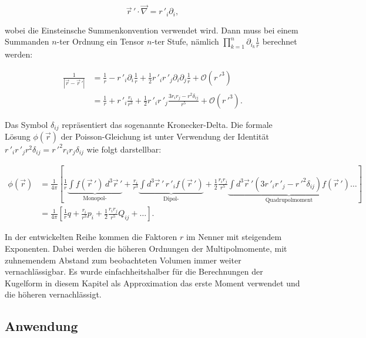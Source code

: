 \begin{equation*}
\vec{r}\,' \cdot \vec{\nabla} = r\,'_{i} \partial_{i},
\end{equation*}

\noindent
wobei die Einsteinsche Summenkonvention verwendet wird.
Dann muss bei einem Summanden \(n\)-ter Ordnung ein Tensor \(n\)-ter Stufe, nämlich \(\textstyle \prod_{k=1}^{n} \partial_{i_{k}} \frac{1}{r}\) berechnet werden:


\begin{align*}
\frac{1}{\left| \vec{r} - \vec{r}\,' \right|} &= \frac{1}{r} - r\,'_{i} \partial_{i} \frac{1}{r} + \frac{1}{2} r\,'_{i} r\,'_{j} \partial_{i} \partial_{j} \frac{1}{r} + \mathcal{O}(r\,'^{3}) \\
&= \frac{1}{r} + r\,'_{i} \frac{r_{i}}{r^{3}} + \frac{1}{2} r\,'_{i} r\,'_{j} \frac{3 r_{i} r_{j} - r^{2} \delta_{ij}}{r^{5}} + \mathcal{O}(r\,'^{3}).
\end{align*}


\noindent
Das Symbol \(\delta_{ij}\) repräsentiert das sogenannte Kronecker-Delta.
Die formale Lösung \(\phi (\vec{r})\) der Poisson-Gleichung ist unter Verwendung der Identität \(r\,'_{i} r\,'_{j} r^{2} \delta_{ij} = r\,'^{2} r_{i} r_{j} \delta_{ij}\) wie folgt darstellbar:


\begin{align*}
\phi (\vec{r}) &= \frac{1}{4\pi} \left[ \frac{1}{r} \underbrace{\int f (\vec{r}\,') \, d^3 \vec{r}\,'}_{\text{Monopol-}} + \frac{r_{i}}{r^{3}} \underbrace{\int d^3 \vec{r}\,' \, r\,'_{i} f (\vec{r}\,')}_{\text{Dipol-}} + \frac{1}{2} \frac{r_{i} r_{j}}{r^{5}} \underbrace{\int d^3 \vec{r}\,' \left( 3 r\,'_{i} r\,'_{j} - r\,'^{2} \delta_{ij} \right) f (\vec{r}\,')}_{\text{Quadrupolmoment}} \dots \right] \\
&= \frac{1}{4\pi} \left[ \frac{1}{r} q + \frac{r_{i}}{r^{3}} p_{i} + \frac{1}{2} \frac{r_{i} r_{j}}{r^{5}} Q_{ij} + \dots \right].
\end{align*}


In der entwickelten Reihe kommen die Faktoren \(r\) im Nenner mit steigendem Exponenten.
Dabei werden die höheren Ordnungen der Multipolmomente, mit zuhnemendem Abstand zum beobachteten Volumen immer weiter vernachlässigbar.
Es wurde einfachheitshalber für die Berechnungen der Kugelform in diesem Kapitel als Approximation das erste Moment verwendet und die höheren vernachlässigt.



\subsection{Anwendung
\label{planet:subsection:anwendung}}

